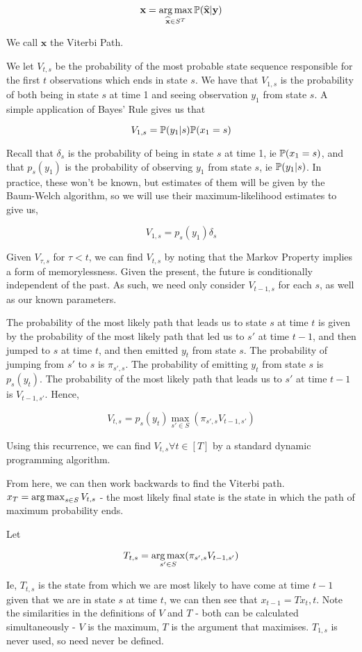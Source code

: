 $$
\mathbf{x} = \operatorname*{arg\,max}_{\widehat{\mathbf{x}} \in S^T} \mathbb{P}(\mathbf{\widehat{x}} | \mathbf{y})
$$

We call $\mathbf{x}$ the Viterbi Path.

We let $V_{t,s}$ be the probability of the most probable state sequence responsible for the first $t$ observations which ends in state $s$. We have that $V_{1,s}$ is the probability of both being in state $s$ at time 1 and seeing observation $y_1$ from state $s$. A simple application of Bayes' Rule gives us that

$$
V_{1,s} = \mathbb{P} (y_1|s)\mathbb{P}(x_1=s)
$$

Recall that $\delta_s$ is the probability of being in state $s$ at time 1, ie $\mathbb{P}(x_1=s)$, and that $p_s(y_1)$ is the probability of observing $y_1$ from state $s$, ie $\mathbb{P} (y_1|s)$. In practice, these won't be known, but estimates of them will be given by the Baum-Welch algorithm, so we will use their maximum-likelihood estimates to give us,

$$
V_{1,s} = p_s(y_1)\delta_s
$$

Given $V_{\tau,s}$ for $\tau < t$, we can find $V_{t,s}$ by noting that the Markov Property implies a form of memorylessness. Given the present, the future is conditionally independent of the past. As such, we need only consider $V_{t-1,s}$ for each $s$, as well as our known parameters. 

The probability of the most likely path that leads us to state $s$ at time $t$ is given by the probability of the most likely path that led us to $s'$ at time $t-1$, and then jumped to $s$ at time $t$, and then emitted $y_t$ from state $s$. The probability of jumping from $s'$ to $s$ is $\pi_{s',s}$. The probability of emitting $y_t$ from state $s$ is $p_s(y_t)$. The probability of the most likely path that leads us to $s'$ at time $t-1$ is $V_{t-1,s'}$. Hence,

$$
V_{t,s} = p_s(y_t) \max_{s'\in S} (\pi_{s',s}V_{t-1,s'})
$$

Using this recurrence, we can find $V_{t,s} \forall t \in [T]$ by a standard dynamic programming algorithm.

From here, we can then work backwards to find the Viterbi path. $x_T = \operatorname*{arg\,max}_{s \in S} V_{t,s}$ - the most likely final state is the state in which the path of maximum probability ends.

Let
 
$$
T_{t,s} = \operatorname*{arg\,max}_{s'\in S}(\pi_{s',s}V_{t-1,s'})
$$

Ie, $T_{t,s}$ is the state from which we are most likely to have come at time $t-1$ given that we are in state $s$ at time $t$, we can then see that $x_{t-1} = T{x_t,t}$. Note the similarities in the definitions of $V$ and $T$ - both can be calculated simultaneously - $V$ is the maximum, $T$ is the argument that maximises. $T_{1,s}$ is never used, so need never be defined. 

